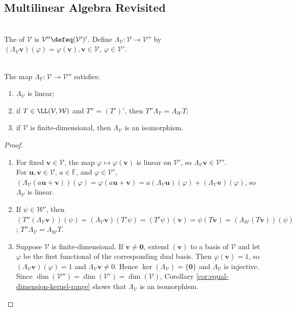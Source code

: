\subsection{Multilinear Algebra Revisited}

\begin{definition} \\
The  of $\mathcal{V}$ is $\mathcal{V}''\defeq(\mathcal{V}')'$. Define $\Lambda_{\mathcal{V}}:\mathcal{V}\to\mathcal{V}''$ by $(\Lambda_{\mathcal{V}}\mathbf{v})(\varphi)=\varphi(\mathbf{v}), \mathbf{v}\in\mathcal{V},\ \varphi\in\mathcal{V}'$.
\end{definition}

\begin{theorem} \label{thm:natural-map-to-double-dual} \\
The map $\Lambda_{\mathcal{V}}:\mathcal{V}\to\mathcal{V}''$ satisfies:
\begin{enumerate}[label=(\roman*)]
\setlength{\itemsep}{0pt}
\item $\Lambda_{\mathcal{V}}$ is linear;
\item if $T\in\LL(\mathcal{V},\mathcal{W})$ and $T''=(T')'$, then $T''\Lambda_{\mathcal{V}}=\Lambda_{\mathcal{W}}T$;
\item if $\mathcal{V}$ is finite-dimensional, then $\Lambda_{\mathcal{V}}$ is an isomorphism.
\end{enumerate}
\begin{proof}
\begin{enumerate}[label=(\roman*)]
\setlength{\itemsep}{0pt}
\item
For fixed $\mathbf{v}\in\mathcal{V}$, the map $\varphi\mapsto\varphi(\mathbf{v})$ is linear on $\mathcal{V}'$, so $\Lambda_{\mathcal{V}}\mathbf{v}\in\mathcal{V}''$.\\
For $\mathbf{u},\mathbf{v}\in\mathcal{V}$, $a\in\mathbb{F}$, and $\varphi\in\mathcal{V}'$, $(\Lambda_{\mathcal{V}}(a\mathbf{u}+\mathbf{v}))(\varphi) =\varphi(a\mathbf{u}+\mathbf{v}) =a(\Lambda_{\mathcal{V}}\mathbf{u})(\varphi)+(\Lambda_{\mathcal{V}}\mathbf{v})(\varphi)$, so $\Lambda_{\mathcal{V}}$ is linear.
\item If $\psi\in\mathcal{W}'$, then $\left(T''(\Lambda_{\mathcal{V}}\mathbf{v})\right)(\psi) =(\Lambda_{\mathcal{V}}\mathbf{v})(T'\psi) =(T'\psi)(\mathbf{v}) =\psi(T\mathbf{v}) =\left(\Lambda_{\mathcal{W}}(T\mathbf{v})\right)(\psi)$; $T''\Lambda_{\mathcal{V}}=\Lambda_{\mathcal{W}}T$.
\item
Suppose $\mathcal{V}$ is finite-dimensional. If $\mathbf{v}\neq\mathbf{0}$, extend $(\mathbf{v})$ to a basis of $\mathcal{V}$ and let $\varphi$ be the first functional of the corresponding dual basis. Then $\varphi(\mathbf{v})=1$, so $(\Lambda_{\mathcal{V}}\mathbf{v})(\varphi)=1$ and $\Lambda_{\mathcal{V}}\mathbf{v}\neq0$. Hence $\ker(\Lambda_{\mathcal{V}})=\{\mathbf{0}\}$ and $\Lambda_{\mathcal{V}}$ is injective. Since $\dim(\mathcal{V}'')=\dim(\mathcal{V}')=\dim(\mathcal{V})$, Corollary \ref{cor:equal-dimension-kernel-range} shows that $\Lambda_{\mathcal{V}}$ is an isomorphism.

\end{enumerate}
\end{proof}
\end{theorem}
